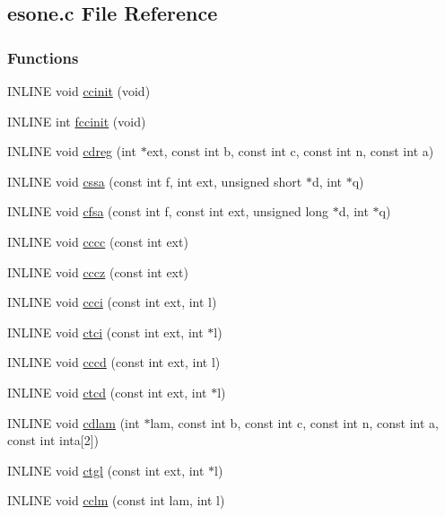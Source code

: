 \subsection{esone.c File Reference}
\label{esone_8c}
\subsubsection*{Functions}
\begin{DoxyCompactItemize}
\item 
INLINE void \hyperlink{esone_8c_aed67ed875fc4e8bb8979077473e21430}{ccinit} (void)
\item 
INLINE int \hyperlink{esone_8c_aa0f89d29b128e78472312a327afeb0eb}{fccinit} (void)
\item 
INLINE void \hyperlink{esone_8c_aaffe7c02487145ee9176798f48d077ed}{cdreg} (int $\ast$ext, const int b, const int c, const int n, const int a)
\item 
INLINE void \hyperlink{esone_8c_a3cac38ee8219ab19a63dd43dbd4c525d}{cssa} (const int f, int ext, unsigned short $\ast$d, int $\ast$q)
\item 
INLINE void \hyperlink{esone_8c_aba3c5f8374e164372dca164835f36217}{cfsa} (const int f, const int ext, unsigned long $\ast$d, int $\ast$q)
\item 
INLINE void \hyperlink{esone_8c_af3ecfc14e0b7fe8c1f06bbc47be53ec2}{cccc} (const int ext)
\item 
INLINE void \hyperlink{esone_8c_a6cc6387b2bfdded1a228fde3a594de3c}{cccz} (const int ext)
\item 
INLINE void \hyperlink{esone_8c_ad5dda9ffd9dbec825608049d8f5fa736}{ccci} (const int ext, int l)
\item 
INLINE void \hyperlink{esone_8c_afb286ebf60cf9e998ad5cb1c4c9c0a8d}{ctci} (const int ext, int $\ast$l)
\item 
INLINE void \hyperlink{esone_8c_afebd482508233fc5203cd61d96aefa52}{cccd} (const int ext, int l)
\item 
INLINE void \hyperlink{esone_8c_ac556218071dba59fa838fde6e94c1d01}{ctcd} (const int ext, int $\ast$l)
\item 
INLINE void \hyperlink{esone_8c_a33de03691bbe1f60fcf1ed57f543a967}{cdlam} (int $\ast$lam, const int b, const int c, const int n, const int a, const int inta\mbox{[}2\mbox{]})
\item 
INLINE void \hyperlink{esone_8c_a9226f10235880c5b374d2550a26e03ea}{ctgl} (const int ext, int $\ast$l)
\item 
INLINE void \hyperlink{esone_8c_a106dd0038ec7a124d344c3f2d2232a73}{cclm} (const int lam, int l)

\end{DoxyCompactItemize}

